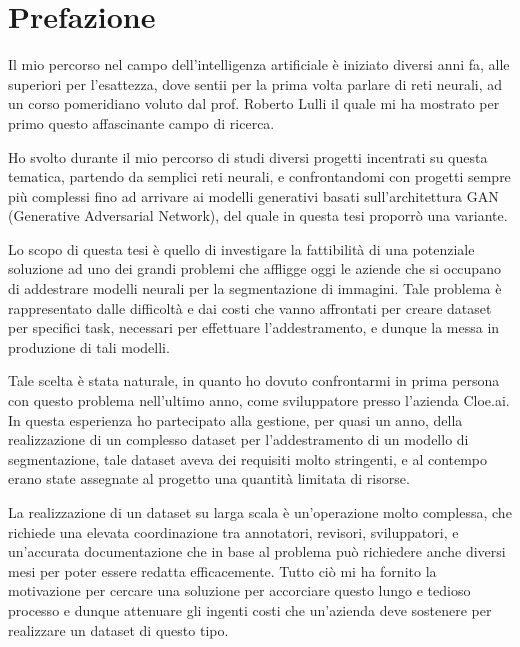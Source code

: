 \clearpage
\phantom{a}
\vfill


\chapter{Prefazione \ok \ok \ok}


\begin{flushleft}


\begin{comment}



\end{comment}


Il mio percorso nel campo dell'intelligenza artificiale è iniziato diversi anni fa, alle superiori per l'esattezza, dove sentii per la prima volta parlare di reti neurali, ad un corso pomeridiano voluto dal prof. Roberto Lulli il quale mi ha mostrato per primo questo affascinante campo di ricerca.

Ho svolto durante il mio percorso di studi diversi progetti incentrati su questa tematica, partendo da semplici reti neurali,
e confrontandomi con progetti sempre più complessi fino ad arrivare ai modelli generativi basati sull'architettura GAN (Generative Adversarial Network),
del quale in questa tesi proporrò una variante.

Lo scopo di questa tesi è quello di investigare la fattibilità di una potenziale soluzione ad uno dei grandi problemi che affligge oggi le aziende che si occupano di addestrare modelli neurali per la segmentazione di immagini. Tale problema è rappresentato dalle difficoltà e dai costi che vanno affrontati per creare dataset per specifici task, necessari per effettuare l'addestramento, e dunque la messa in produzione di tali modelli.

Tale scelta è stata naturale, in quanto ho dovuto confrontarmi in prima persona con questo problema nell'ultimo anno, come sviluppatore presso l'azienda Cloe.ai.
In questa esperienza ho partecipato alla gestione, per quasi un anno, della realizzazione di un complesso dataset per l'addestramento di un modello di segmentazione, 
tale dataset aveva dei requisiti molto stringenti, e al contempo erano state assegnate al progetto una quantità limitata di risorse.

La realizzazione di un dataset su larga scala è un'operazione molto complessa, che richiede una elevata coordinazione tra annotatori, revisori, sviluppatori,
 e un'accurata documentazione che in base al problema può richiedere anche diversi mesi per poter essere redatta efficacemente.
Tutto ciò mi ha fornito la motivazione per cercare una soluzione per accorciare questo lungo e tedioso processo e dunque attenuare
gli ingenti costi che un'azienda deve sostenere per realizzare un dataset di questo tipo. 

\end{flushleft}



\vfill
\newpage